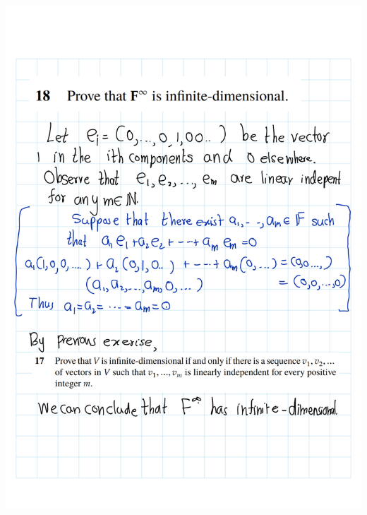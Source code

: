 \documentclass[
]{book}
\theoremstyle{definition}
\theoremstyle{definition}
\theoremstyle{definition}
\theoremstyle{definition}
\theoremstyle{remark}
\begin{document}
\includegraphics{fig/Ex2A/Ex2A-23.png}
\end{document}
